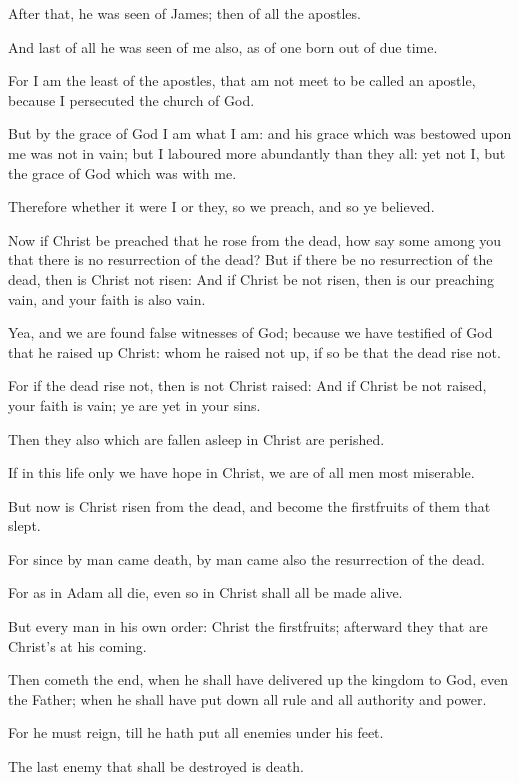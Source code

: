 \Verse After that, he was seen of James; then of all the apostles.

\Verse And last of all he was seen of me also, as of one born out of due time.

\Verse For I am the least of the apostles, that am not meet to be called an apostle, because I persecuted the church of God.

\Verse But by the grace of God I am what I am: and his grace which was bestowed upon me was not in vain; but I laboured more abundantly than they all: yet not I, but the grace of God which was with me.

\Verse Therefore whether it were I or they, so we preach, and so ye believed.

\Verse Now if Christ be preached that he rose from the dead, how say some among you that there is no resurrection of the dead?  \Verse But if there be no resurrection of the dead, then is Christ not risen: \Verse And if Christ be not risen, then is our preaching vain, and your faith is also vain.

\Verse Yea, and we are found false witnesses of God; because we have testified of God that he raised up Christ: whom he raised not up, if so be that the dead rise not.

\Verse For if the dead rise not, then is not Christ raised: \Verse And if Christ be not raised, your faith is vain; ye are yet in your sins.

\Verse Then they also which are fallen asleep in Christ are perished.

\Verse If in this life only we have hope in Christ, we are of all men most miserable.

\Verse But now is Christ risen from the dead, and become the firstfruits of them that slept.

\Verse For since by man came death, by man came also the resurrection of the dead.

\Verse For as in Adam all die, even so in Christ shall all be made alive.

\Verse But every man in his own order: Christ the firstfruits; afterward they that are Christ's at his coming.

\Verse Then cometh the end, when he shall have delivered up the kingdom to God, even the Father; when he shall have put down all rule and all authority and power.

\Verse For he must reign, till he hath put all enemies under his feet.

\Verse The last enemy that shall be destroyed is death.

